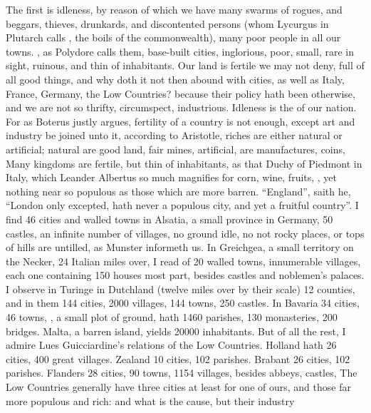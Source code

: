 The first is idleness, by reason of which we have many swarms of rogues, and
beggars, thieves, drunkards, and discontented persons (whom Lycurgus in
Plutarch calls , the boils of the commonwealth), many
poor people in all our towns. , as
Polydore calls them, base-built cities, inglorious, poor,
small, rare in sight, ruinous, and thin of inhabitants. Our land is fertile we
may not deny, full of all good things, and why doth it not then abound with
cities, as well as Italy, France, Germany, the Low Countries? because their
policy hath been otherwise, and we are not so thrifty, circumspect,
industrious. Idleness is the  of our nation. For as
Boterus justly argues, fertility of a country is not
enough, except art and industry be joined unto it, according to Aristotle,
riches are either natural or artificial; natural are good land, fair mines,
\etc{} artificial, are manufactures, coins, \etc{} Many kingdoms are fertile,
but thin of inhabitants, as that Duchy of Piedmont in Italy, which Leander
Albertus so much magnifies for corn, wine, fruits, \etc{}, yet nothing near so
populous as those which are more barren. \enquote{England}, saith
he, \enquote{London only excepted, hath never a populous city, and yet a fruitful
country}. I find 46 cities and walled towns in Alsatia, a small province in
Germany, 50 castles, an infinite number of villages, no ground idle, no not
rocky places, or tops of hills are untilled, as Munster
informeth us. In Greichgea, a small territory on the
Necker, 24 Italian miles over, I read of 20 walled towns, innumerable villages,
each one containing 150 houses most part, besides castles and noblemen's
palaces. I observe in Turinge in Dutchland (twelve miles
over by their scale) 12 counties, and in them 144 cities, 2000 villages, 144
towns, 250 castles. In Bavaria 34 cities, 46 towns, \etc{}
, a small plot of ground, hath
1460 parishes, 130 monasteries, 200 bridges. Malta, a barren island, yields
20\thinspace{}000 inhabitants. But of all the rest, I admire Lues
Guicciardine's relations of the Low Countries. Holland hath 26 cities, 400
great villages. Zealand 10 cities, 102 parishes. Brabant 26 cities, 102
parishes. Flanders 28 cities, 90 towns, 1154 villages, besides abbeys, castles,
\etc{} The Low Countries generally have three cities at least for one of ours,
and those far more populous and rich: and what is the cause, but their industry
